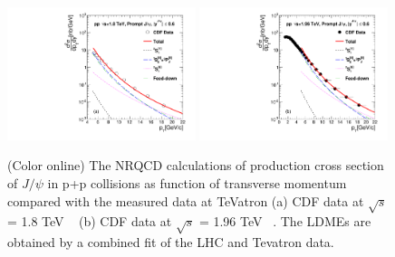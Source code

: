 \documentclass[aps,prc,preprint,superscriptaddress,showpacs,showkeys,amsmath]{revtex4-1}
\begin{document}
\begin{figure}
\includegraphics[width=0.49\textwidth]{Figures/JPsi/CDF_RootS180TeV_D2NDPtDy_PromptJPsi_Y0006_Pt.pdf}
\includegraphics[width=0.49\textwidth]{Figures/JPsi/CDF_196TeV_D2NDPtDy_PromptJPsi_Y0006_Pt.pdf}
\caption{(Color online) 
  The NRQCD calculations of production cross section of $J/\psi$ in p+p collisions 
  as function of transverse momentum compared with the measured data at TeVatron 
  (a) CDF data at $\sqrt{s}$ = 1.8 TeV ~\cite{Abe:1997jz} 
  (b) CDF data at $\sqrt{s}$ = 1.96 TeV ~\cite{Acosta:2004yw}. 
  The LDMEs are obtained by a combined fit of the LHC and Tevatron data.
}
\label{Fig:LDMEJPsiCDF}
\end{figure}
\end{document}
